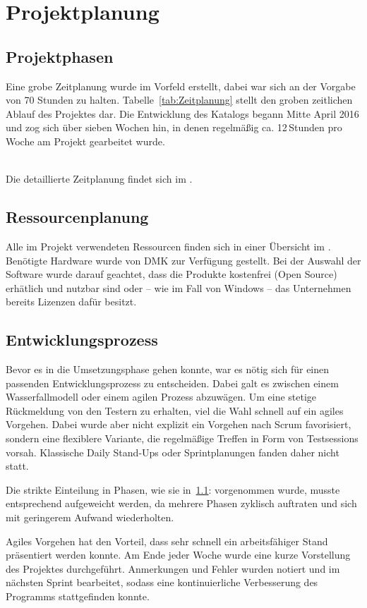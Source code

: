 \section{Projektplanung} 
\label{sec:Projektplanung}

\subsection{Projektphasen}
\label{sec:Projektphasen}
Eine grobe Zeitplanung wurde im Vorfeld erstellt, dabei war sich an der Vorgabe
von 70 Stunden zu halten. Tabelle~\ref{tab:Zeitplanung} stellt den
groben zeitlichen Ablauf des Projektes dar. Die Entwicklung des Katalogs begann
Mitte April 2016 und zog sich über sieben Wochen hin, in denen regelmäßig
ca. 12\,Stunden pro Woche am Projekt gearbeitet wurde.

\\
Die detaillierte Zeitplanung findet sich im .

\subsection{Ressourcenplanung}
\label{sec:Ressourcenplanung}
Alle im Projekt verwendeten Ressourcen finden sich in einer Übersicht im
. Benötigte Hardware wurde von \acs{DMK} zur
Verfügung gestellt. Bei der Auswahl der Software wurde darauf geachtet, dass die
Produkte kostenfrei (\zB Open Source) erhätlich und nutzbar sind oder -- wie im Fall
von Windows -- das Unternehmen bereits Lizenzen dafür besitzt.

\subsection{Entwicklungsprozess}
\label{sec:Entwicklungsprozess}
Bevor es in die Umsetzungsphase gehen konnte, war es nötig sich für einen
passenden Entwicklungsprozess zu entscheiden. Dabei galt es zwischen einem
Wasserfallmodell oder einem agilen Prozess abzuwägen. Um eine stetige
Rückmeldung von den Testern zu erhalten, viel die Wahl schnell auf ein agiles
Vorgehen. Dabei wurde aber nicht explizit ein Vorgehen nach Scrum favorisiert,
sondern eine flexiblere Variante, die regelmäßige Treffen in Form von
Testsessions vorsah. Klassische Daily Stand-Ups oder Sprintplanungen fanden
daher nicht statt.

Die strikte Einteilung in Phasen, wie sie in~\ref{sec:Projektphasen}:
 vorgenommen wurde, musste entsprechend aufgeweicht
werden, da mehrere Phasen zyklisch auftraten und sich mit geringerem Aufwand
wiederholten.

Agiles Vorgehen hat den Vorteil, dass sehr schnell ein arbeitsfähiger Stand
präsentiert werden konnte. Am Ende jeder Woche wurde eine kurze Vorstellung des
Projektes durchgeführt. Anmerkungen und Fehler wurden notiert und im nächsten
Sprint bearbeitet, sodass eine kontinuierliche Verbesserung des Programms
stattgefinden konnte.